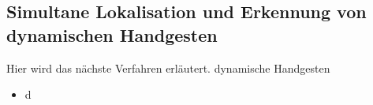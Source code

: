 \subsection{Simultane Lokalisation und Erkennung von dynamischen Handgesten}
Hier wird das nächste Verfahren erl\"autert. dynamische Handgesten
\begin{itemize}
\item d
\end{itemize}
